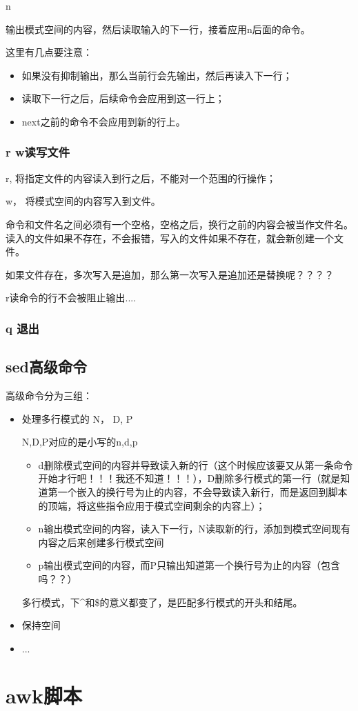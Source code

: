 \begin{Command-Line}
[address]n
\end{Command-Line}

输出模式空间的内容，然后读取输入的下一行，接着应用n后面的命令。

这里有几点要注意：
\begin{itemize}
\item 如果没有抑制输出，那么当前行会先输出，然后再读入下一行；
\item 读取下一行之后，后续命令会应用到这一行上；
\item next之前的命令不会应用到新的行上。
\end{itemize}

\subsubsection{r w读写文件}

r, 将指定文件的内容读入到行之后，不能对一个范围的行操作；

w， 将模式空间的内容写入到文件。


命令和文件名之间必须有一个空格，空格之后，换行之前的内容会被当作文件名。读入的文件如果不存在，不会报错，写入的文件如果不存在，就会新创建一个文件。

如果文件存在，多次写入是追加，那么第一次写入是追加还是替换呢？？？？


r读命令的行不会被阻止输出....



\subsubsection{q 退出}

\subsection{sed高级命令}

高级命令分为三组：
\begin{itemize}
\item 处理多行模式的 N， D, P

N,D,P对应的是小写的n,d,p
\begin{itemize}
\item d删除模式空间的内容并导致读入新的行（这个时候应该要又从第一条命令开始才行吧！！！我还不知道！！！），D删除多行模式的第一行（就是知道第一个嵌入的换行号为止的内容，不会导致读入新行，而是返回到脚本的顶端，将这些指令应用于模式空间剩余的内容上）；
\item n输出模式空间的内容，读入下一行，N读取新的行，添加到模式空间现有内容之后来创建多行模式空间
\item p输出模式空间的内容，而P只输出知道第一个换行号为止的内容（包含吗？？）
\end{itemize}
多行模式，下^和\$的意义都变了，是匹配多行模式的开头和结尾。

\item 保持空间
\item ...
\end{itemize}


\section{awk脚本}



